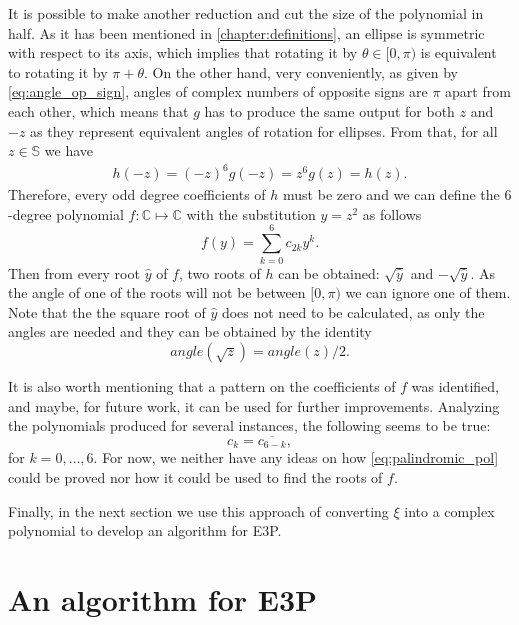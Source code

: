 It is possible to make another reduction and cut the size of the polynomial in half.
As it has been mentioned in \autoref{chapter:definitions}, an ellipse is symmetric with respect to its axis, which implies that rotating it by $\theta \in [0, \pi)$ is equivalent to rotating it by $\pi + \theta$.
On the other hand, very conveniently, as given by \autoref{eq:angle_op_sign}, angles of complex numbers of opposite signs are $\pi$ apart from each other, which means that $g$ has to produce the same output for both $z$ and $-z$ as they represent equivalent angles of rotation for ellipses.
From that, for all $z\in \mathbb{S}$ we have
\begin{align*}
h(-z) = (-z)^6g(-z) = z^6g(z) = h(z).
\end{align*}
Therefore, every odd degree coefficients of $h$ must be zero and we can define the $6$-degree polynomial $f : \mathbb{C} \mapsto \mathbb{C}$ with the substitution $y=z^2$ as follows
\begin{equation}
f(y) = \sum_{k=0}^{6} c_{2k} y^k.
\end{equation}
Then from every root $\hat{y}$ of $f$, two roots of $h$ can be obtained: $\sqrt{\hat{y}}$ and $-\sqrt{\hat{y}}$. As the angle of one of the roots will not be between $[0, \pi)$ we can ignore one of them. 
Note that the the square root of $\hat{y}$ does not need to be calculated, as only the angles are needed and they can be obtained by the identity
\begin{equation*}
angle(\sqrt{z}) = angle(z)/2.
\end{equation*}

It is also worth mentioning that a pattern on the coefficients of $f$ was identified, and maybe, for future work, it can be used for further improvements. Analyzing the polynomials produced for several instances, the following seems to be true:
\begin{equation}\label{eq:palindromic_pol}
c_k = \overline{c_{6-k}},
\end{equation}
for $k=0, \dots, 6$. For now, we neither have any ideas on how \autoref{eq:palindromic_pol} could be proved nor how it could be used to find the roots of $f$.

Finally, in the next section we use this approach of converting $\xi$ into a complex polynomial to develop an algorithm for E3P.

\section{An algorithm for E3P}

